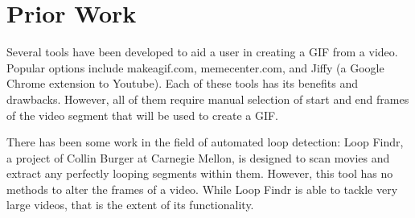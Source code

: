 \section{Prior Work}
\label{sec:PriorWork}
Several tools have been developed to aid a user in creating a GIF from a video. Popular options include makeagif.com, memecenter.com, and Jiffy (a Google Chrome extension to Youtube).
Each of these tools has its benefits and drawbacks. However, all of them require manual selection of start and end frames of the video segment that will be used to create a GIF. 

There has been some work in the field of automated loop detection: Loop Findr, a project of Collin Burger at Carnegie Mellon, is designed to scan movies and extract any perfectly looping segments within them. However, this tool has no methods to alter the frames of a video. While Loop Findr is able to tackle very large videos, that is the extent of its functionality. 
